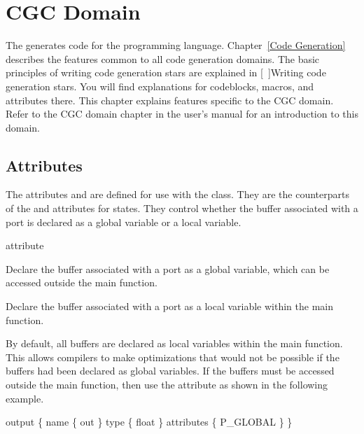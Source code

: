 \chapter{CGC Domain}
\label{CGC Domain}



The  generates code for the  programming
language.  Chapter~\ref{Code Generation} describes the features
common to all code generation domains.
The basic principles of writing code generation stars are explained in
[~\Ref]{Writing code generation stars}.  You will find explanations for
codeblocks, macros, and attributes there.
This chapter explains features
specific to the CGC domain.  Refer to the CGC domain chapter in the
user's manual for an introduction to this domain.

\begin{ifhtml}

\section{Attributes}
\label{CGC Attributes}

The attributes  and  are defined for use
with the  class.  They are
the counterparts of the  and
 attributes for states.  They
control whether the buffer associated with a port is declared as a
global variable or a local variable.

\begin{indexlist}{ attribute}

Declare the buffer associated with a port as a global variable, which
can be accessed outside the main function.

Declare the buffer associated with a port as a local variable within the
main function.

\end{indexlist}

By default, all
buffers are declared as local variables within the main function.  This
allows compilers to make optimizations that would not be possible if
the buffers had been declared as global variables.  If the buffers must
be accessed outside the main function, then use the 
attribute as shown in the following example.

\begin{example}
output
\{
    name \{ out \}
    type \{ float \}
    attributes \{ P\_GLOBAL \}
\}
\end{example}

\end{ifhtml}

